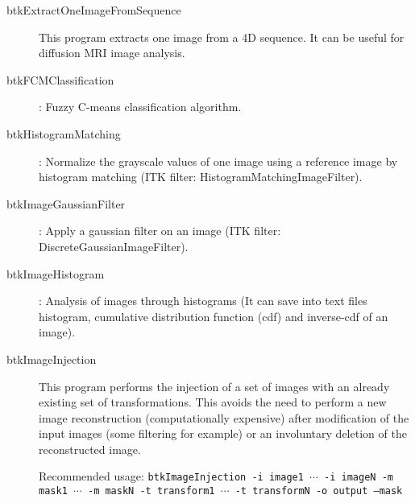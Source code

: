\begin{description}
\item[btkExtractOneImageFromSequence] This program extracts one image from a 4D sequence. It can be useful for diffusion MRI image analysis. 
\item[btkFCMClassification]: Fuzzy C-means classification algorithm.
\item[btkHistogramMatching]: Normalize the grayscale values of one image using a reference image by histogram matching (ITK filter: HistogramMatchingImageFilter).
\item[btkImageGaussianFilter]: Apply a gaussian filter on an image (ITK filter: DiscreteGaussianImageFilter).
\item[btkImageHistogram]: Analysis of images through histograms (It can save into text files histogram, cumulative distribution function (cdf) and inverse-cdf of an image).
\item[btkImageInjection] This program performs the injection of a set
of images with an already existing set of transformations. This avoids the need
to perform a new image reconstruction (computationally expensive) after
modification of the input images (some filtering for example) or an involuntary
deletion of the reconstructed image.

Recommended usage: \texttt{btkImageInjection -i image1 $\cdots$ -i
imageN -m mask1 $\cdots$ -m maskN -t transform1 $\cdots$ -t
transformN -o output --mask}


\end{description}
